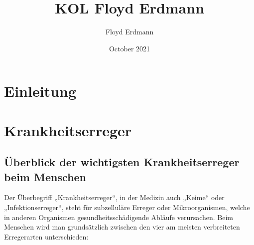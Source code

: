 \documentclass[12pt]{article}
\title{KOL Floyd Erdmann}
\author{Floyd Erdmann}
\date{October 2021}
\begin{document}
\setlength{\baselineskip}{5mm}
\maketitle
\onehalfspacing

\newpage

\tableofcontents

\newpage
\section{Einleitung}


\section{Krankheitserreger}
\subsection{Überblick der wichtigsten Krankheitserreger beim Menschen}
Der Überbegriff „Krankheitserreger“, in der Medizin auch „Keime“ oder „Infektionserreger“, steht für subzelluläre Erreger oder Mikroorganismen, welche in anderen Organismen gesundheitsschädigende Abläufe verursachen. Beim Menschen wird man grundsätzlich zwischen den vier am meisten verbreiteten Erregerarten unterschieden:
\end{document}
